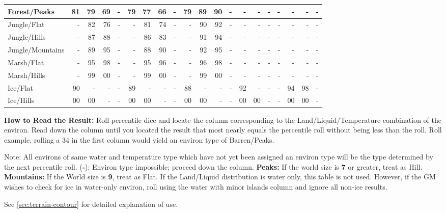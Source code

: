 \begin{table}[htbp]
{\begin{minipage}{\textwidth}
\begin{tabular}{l|rrrr|rrrr|rrrr|rrrr|rrr}
Forest/Peaks & 81 & 79 & 69 & - & 79 & 77 & 66 & - & 79 & 89 & 90 & - & - & - & - & - & - & - & -\\
        \hline
\rowcolor{grey}
Jungle/Flat & - & 82 & 76 & - & - & 81 & 74 & - & - & 90 & 92 & - & - & - & - & - & - & - & -\\
Jungle/Hills & - & 87 & 88 & - & - & 86 & 83 & - & - & 91 & 94 & - & - & - & - & - & - & - & -\\
\rowcolor{grey}
Jungle/Mountains & - & 89 & 95 & - & - & 88 & 90 & - & - & 92 & 95 & - & - & - & - & - & - & - & -\\
        \hline
Marsh/Flat & - & 95 & 98 & - & - & 95 & 96 & - & - & 96 & 98 & - & - & - & - & - & - & - & -\\
\rowcolor{grey}
Marsh/Hills & - & 99 & 00 & - & - & 99 & 00 & - & - & 99 & 00 & - & - & - & - & - & - & - & -\\
        \hline
Ice/Flat & 90 & - & - & - & 89 & - & - & - & 88 & - & - & - & 92 & - & - & - & 94 & 98 & -\\
\rowcolor{grey}
Ice/Hills & 00 & 00 & - & - & 00 & 00 & - & - & 00 & 00 & - & - & 00 &
        00 & - & - & 00 & 00 & -\\
        \hline
      \end{tabular}

      \medskip

      \parbox{\textwidth}{\textbf{How to Read the Result:} Roll
        percentile dice and locate the column corresponding to the
        Land/Liquid/Temperature combination of the environ. Read down
        the column until you located the result that most nearly
        equals the percentile roll without being less than the roll.
        Roll example, rolling a 34 in the first column would yield an
        environ type of Barren/Peaks.
        
        Note: All environs of same water and temperature type which
        have not yet been assigned an environ type will be the type
        determined by the next percentile roll. (\textbf{-}): Environ
        type impossible; proceed down the column. \textbf{Peaks:} If
        the world size is \textbf{7} or greater, treat as Hill.
        \textbf{Mountains:} If the World size is \textbf{9}, treat as
        Flat. If the Land/Liquid distribution is water only, this table
        is not used.  However, if the GM wishes to check for ice in
        water-only environ, roll using the water with minor islands
        column and ignore all non-ice results.
        
        See \ref{sec:terrain-contour} for detailed explanation of use.}
    \end{minipage}}
\end{table}

